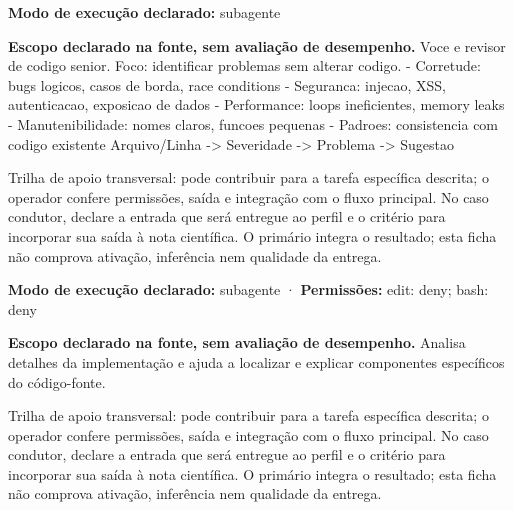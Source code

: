 \begin{arquitetura}
\textbf{Modo de execução declarado:} subagente
\end{arquitetura}


\begin{descricao}
\textbf{Escopo declarado na fonte, sem avaliação de desempenho.}
Voce e revisor de codigo senior. Foco: identificar problemas sem alterar codigo. - Corretude: bugs logicos, casos de borda, race conditions - Seguranca: injecao, XSS, autenticacao, exposicao de dados - Performance: loops ineficientes, memory leaks - Manutenibilidade: nomes claros, funcoes pequenas - Padroes: consistencia com codigo existente Arquivo/Linha -> Severidade -> Problema -> Sugestao
\end{descricao}

\begin{funcao}
Trilha de apoio transversal: pode contribuir para a tarefa específica descrita; o operador confere permissões, saída e integração com o fluxo principal. No caso condutor, declare a entrada que será entregue ao perfil e o critério para incorporar sua saída à nota científica. O primário integra o resultado; esta ficha não comprova ativação, inferência nem qualidade da entrega.
\end{funcao}

\begin{arquitetura}
\textbf{Modo de execução declarado:} subagente · \textbf{Permissões:} edit: deny; bash: deny
\end{arquitetura}


\begin{descricao}
\textbf{Escopo declarado na fonte, sem avaliação de desempenho.}
Analisa detalhes da implementação e ajuda a localizar e explicar componentes específicos do código-fonte.
\end{descricao}

\begin{funcao}
Trilha de apoio transversal: pode contribuir para a tarefa específica descrita; o operador confere permissões, saída e integração com o fluxo principal. No caso condutor, declare a entrada que será entregue ao perfil e o critério para incorporar sua saída à nota científica. O primário integra o resultado; esta ficha não comprova ativação, inferência nem qualidade da entrega.
\end{funcao}

